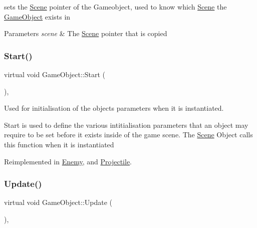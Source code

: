 sets the \hyperlink{class_scene}{Scene} pointer of the Gameobject, used to know which \hyperlink{class_scene}{Scene} the \hyperlink{class_game_object}{Game\+Object} exists in 


\begin{DoxyParams}{Parameters}
{\em scene} & The \hyperlink{class_scene}{Scene} pointer that is copied \\
\hline
\end{DoxyParams}
\mbox{\label{class_game_object_aeeb2162f2779e5591a372a1568bc5c68}} 
\subsubsection{\texorpdfstring{Start()}{Start()}}
{\footnotesize\ttfamily virtual void Game\+Object\+::\+Start (\begin{DoxyParamCaption}{ }\end{DoxyParamCaption})\hspace{0.3cm}{\ttfamily [inline]}, {\ttfamily [virtual]}}



Used for initialisation of the objects parameters when it is instantiated. 

Start is used to define the various intitialisation parameters that an object may require to be set before it exists inside of the game scene. The \hyperlink{class_scene}{Scene} Object calls this function when it is instantiated 

Reimplemented in \hyperlink{class_enemy_a64ee0cc6fb8a3424d486537efb8205d8}{Enemy}, and \hyperlink{class_projectile_a27a59059730a66a37feec766ebe08fa2}{Projectile}.

\mbox{\label{class_game_object_ac7ecc123dacaba955077420caabf5e64}} 
\subsubsection{\texorpdfstring{Update()}{Update()}}
{\footnotesize\ttfamily virtual void Game\+Object\+::\+Update (\begin{DoxyParamCaption}{ }\end{DoxyParamCaption})\hspace{0.3cm}{\ttfamily [inline]}, {\ttfamily [virtual]}}



